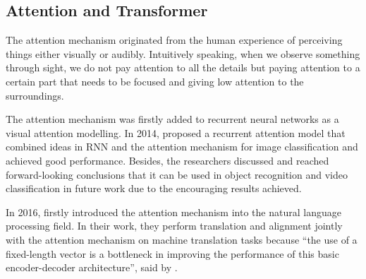 \subsection{Attention and Transformer} %
The attention mechanism originated from the human experience of perceiving things either visually or audibly.
Intuitively speaking, when we observe something through sight, we do not pay attention to all the details but paying attention to a certain part that needs to be focused and giving low attention to the surroundings.

The attention mechanism was firstly added to recurrent neural networks as a visual attention modelling.
In 2014, \citet{mnih2014recurrent} proposed a recurrent attention model that combined ideas in RNN and the attention mechanism for image classification and achieved good performance.
Besides, the researchers discussed and reached forward-looking conclusions that it can be used in object recognition and video classification in future work due to the encouraging results achieved.

In 2016, \citet{bahdanau2016neural} firstly introduced the attention mechanism into the natural language processing field.
In their work, they perform translation and alignment jointly with the attention mechanism on machine translation tasks because ``the use of a fixed-length vector is a bottleneck in improving the performance of this basic encoder-decoder architecture'', said by \citet{bahdanau2016neural}.

